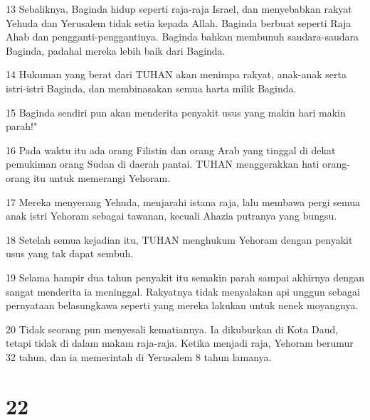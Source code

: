 \par 13 Sebaliknya, Baginda hidup seperti raja-raja Israel, dan menyebabkan rakyat Yehuda dan Yerusalem tidak setia kepada Allah. Baginda berbuat seperti Raja Ahab dan pengganti-penggantinya. Baginda bahkan membunuh saudara-saudara Baginda, padahal mereka lebih baik dari Baginda.
\par 14 Hukuman yang berat dari TUHAN akan menimpa rakyat, anak-anak serta istri-istri Baginda, dan membinasakan semua harta milik Baginda.
\par 15 Baginda sendiri pun akan menderita penyakit usus yang makin hari makin parah!"
\par 16 Pada waktu itu ada orang Filistin dan orang Arab yang tinggal di dekat pemukiman orang Sudan di daerah pantai. TUHAN menggerakkan hati orang-orang itu untuk memerangi Yehoram.
\par 17 Mereka menyerang Yehuda, menjarahi istana raja, lalu membawa pergi semua anak istri Yehoram sebagai tawanan, kecuali Ahazia putranya yang bungsu.
\par 18 Setelah semua kejadian itu, TUHAN menghukum Yehoram dengan penyakit usus yang tak dapat sembuh.
\par 19 Selama hampir dua tahun penyakit itu semakin parah sampai akhirnya dengan sangat menderita ia meninggal. Rakyatnya tidak menyalakan api unggun sebagai pernyataan belasungkawa seperti yang mereka lakukan untuk nenek moyangnya.
\par 20 Tidak seorang pun menyesali kematiannya. Ia dikuburkan di Kota Daud, tetapi tidak di dalam makam raja-raja. Ketika menjadi raja, Yehoram berumur 32 tahun, dan ia memerintah di Yerusalem 8 tahun lamanya.

\chapter{22}

